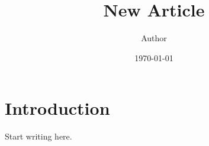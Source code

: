 \documentclass{article}
\title{New Article}
\author{Author}
\date{\today}
\begin{document}
\maketitle

\section{Introduction}

Start writing here.
\end{document}
